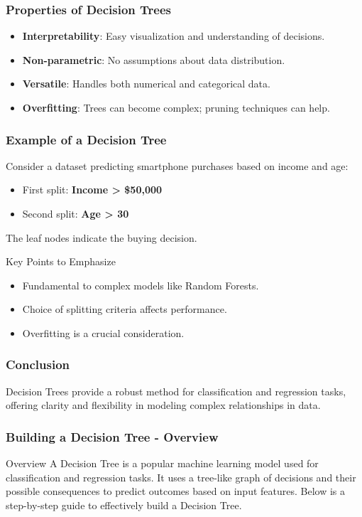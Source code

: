 \documentclass[aspectratio=169]{beamer}
\begin{document}
\begin{frame}[fragile]
    \frametitle{Properties of Decision Trees}
    \begin{itemize}
        \item \textbf{Interpretability}: Easy visualization and understanding of decisions.
        \item \textbf{Non-parametric}: No assumptions about data distribution.
        \item \textbf{Versatile}: Handles both numerical and categorical data.
        \item \textbf{Overfitting}: Trees can become complex; pruning techniques can help.
    \end{itemize}
\end{frame}

\begin{frame}[fragile]
    \frametitle{Example of a Decision Tree}
    Consider a dataset predicting smartphone purchases based on income and age:
    \begin{itemize}
        \item First split: \textbf{Income > \$50,000}
        \item Second split: \textbf{Age > 30}
    \end{itemize}
    The leaf nodes indicate the buying decision.

    \begin{block}{Key Points to Emphasize}
        \begin{itemize}
            \item Fundamental to complex models like Random Forests.
            \item Choice of splitting criteria affects performance.
            \item Overfitting is a crucial consideration.
        \end{itemize}
    \end{block}
\end{frame}

\begin{frame}[fragile]
    \frametitle{Conclusion}
    Decision Trees provide a robust method for classification and regression tasks, offering clarity and flexibility in modeling complex relationships in data.
\end{frame}

\begin{frame}[fragile]
    \frametitle{Building a Decision Tree - Overview}
    \begin{block}{Overview}
        A Decision Tree is a popular machine learning model used for classification and regression tasks. 
        It uses a tree-like graph of decisions and their possible consequences to predict outcomes based on input features. 
        Below is a step-by-step guide to effectively build a Decision Tree.
    \end{block}
\end{frame}
\end{document}
